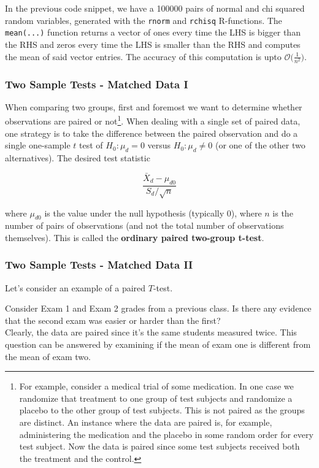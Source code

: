 \documentclass{homework}
\begin{document}
In the previous code snippet, we have a 100000 pairs of normal and chi squared random variables, generated with the \texttt{rnorm} and \texttt{rchisq} R-functions. The \texttt{mean(...)} function returns a vector of ones every time the LHS is bigger than the RHS and zeros every time the LHS is smaller than the RHS and computes the mean of said vector entries. The accuracy of this computation is upto $\mathcal{O}\bigg(\frac{1}{n^2}\bigg)$. \\

\subsubsection{Two Sample Tests - Matched Data I}

When comparing two groups, first and foremost we want to determine whether observations are paired or not\footnote{For example, consider a medical trial of some medication. In one case we randomize that treatment to one group of test subjects and randomize a placebo to the other group of test subjects. This is not paired as the groups are distinct. An instance where the data are paired is, for example, administering the medication and the placebo in some random order for every test subject. Now the data is paired since some test subjects received both the treatment and the control.}. When dealing with a single set of paired data, one strategy is to take the difference between the paired observation and do a single one-sample $t$ test of $H_0 : \mu_d = 0$ versus $H_0 : \mu_d \neq 0$ (or one of the other two alternatives). The desired test statistic

$$
\frac{\bar{X}_d - \mu_{d0}}{S_d/\sqrt{n}}
$$

where $\mu_{d0}$ is the value under the null hypothesis (typically 0), where $n$ is the number of pairs of observations (and not the total number of observations themselves). This is called the \textbf{ordinary paired two-group t-test}. \\

\subsubsection{Two Sample Tests - Matched Data II}

Let's consider an example of a paired $T$-test.

\begin{tcolorbox}[title=Example]
Consider Exam 1 and Exam 2 grades from a previous class. Is there any evidence that the second exam was easier or harder than the first? \\

Clearly, the data are paired since it's the same students measured twice. This question can be answered by examining if the mean of exam one is different from the mean of exam two. 
\end{tcolorbox}
\end{document}
